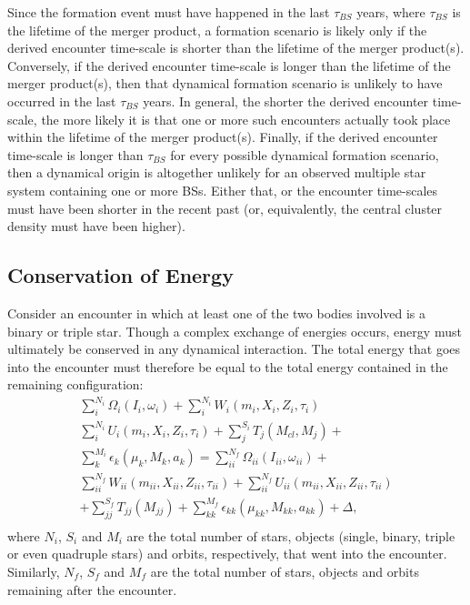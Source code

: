 Since the formation event must have happened in the last 
$\tau_{BS}$ years, where $\tau_{BS}$ is the lifetime of the merger
product, a formation scenario is likely only if the derived encounter
time-scale is shorter than the lifetime of the merger product(s).
Conversely, if the derived encounter time-scale is longer than the
lifetime of the merger product(s), then that dynamical formation scenario 
is unlikely to have occurred in the last $\tau_{BS}$ years.  In
general, the shorter the derived encounter time-scale, the
more likely it is that one or more such encounters actually took place
within the lifetime of the merger product(s).  Finally, if the
derived encounter time-scale is longer than $\tau_{BS}$ for every
possible dynamical formation scenario, then a dynamical origin is
altogether unlikely for an observed multiple star system containing
one or more BSs.  Either that, or the encounter time-scales must have
been shorter in the recent past (or, equivalently, the central cluster
density must have been higher). 

\subsection{Conservation of Energy} \label{energy}

Consider an encounter in which at least one of the two bodies involved
is a binary or triple star.  Though a complex exchange of energies occurs,
energy must ultimately be
conserved in any dynamical interaction.  The total energy that goes
into the encounter must therefore be equal to the total energy
contained in the remaining configuration:
\begin{equation}
\begin{gathered}
\label{eqn:energy-conserv}
\sum_i^{N_i} \Omega_i(I_i,\omega_i) + \sum_i^{N_i} W_i(m_i,X_i,Z_i,\tau_i) \\ 
\sum_i^{N_i} U_i(m_i,X_i,Z_i,\tau_i) + \sum_j^{S_i} T_j(M_{cl},M_j) + \\ 
\sum_k^{M_i} \epsilon_k(\mu_k,M_k,a_k) =
    \sum_{ii}^{N_f} \Omega_{ii}(I_{ii},\omega_{ii}) + \\
 \sum_{ii}^{N_f} W_{ii}(m_{ii},X_{ii},Z_{ii},\tau_{ii}) + \sum_{ii}^{N_f} U_{ii}(m_{ii},X_{ii},Z_{ii},\tau_{ii})
 \\
+ \sum_{jj}^{S_f} T_{jj}(M_{jj}) + \sum_{kk}^{M_f} \epsilon_{kk}(\mu_{kk},M_{kk},a_{kk}) +
  \Delta, \\
\end{gathered}
\end{equation}
where $N_i$, $S_i$ and $M_i$ are the total number of stars, objects
(single, binary, triple or even quadruple stars) and orbits,
respectively, that went into the encounter.  Similarly, $N_f$, $S_f$ and
$M_f$ are the total number of stars, objects and orbits remaining after the
encounter. 

